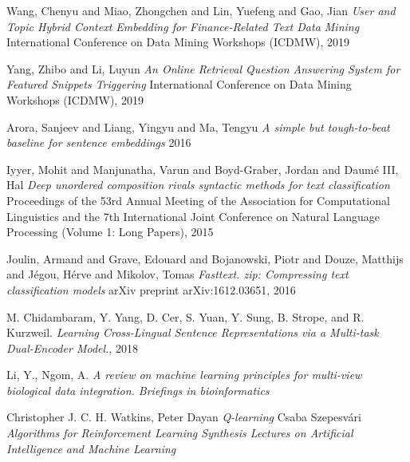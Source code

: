 \begin{thebibliography}{9}
Wang, Chenyu and Miao, Zhongchen and Lin, Yuefeng and Gao, Jian\newline
\textit{User and Topic Hybrid Context Embedding for Finance-Related Text Data Mining} International Conference on Data Mining Workshops (ICDMW), 2019

Yang, Zhibo and Li, Luyun\newline
\textit{An Online Retrieval Question Answering System for Featured Snippets Triggering} International Conference on Data Mining Workshops (ICDMW), 2019

Arora, Sanjeev and Liang, Yingyu and Ma, Tengyu\newline
\textit{A simple but tough-to-beat baseline for sentence embeddings}
2016

Iyyer, Mohit and Manjunatha, Varun and Boyd-Graber, Jordan and Daum{\'e} III, Hal\newline
\textit{Deep unordered composition rivals syntactic methods for text classification}\newline
Proceedings of the 53rd Annual Meeting of the Association for Computational Linguistics and the 7th International Joint Conference on Natural Language Processing (Volume 1: Long Papers), 2015

Joulin, Armand and Grave, Edouard and Bojanowski, Piotr and Douze, Matthijs and J{\'e}gou, H{\'e}rve and Mikolov, Tomas\newline
\textit{Fasttext. zip: Compressing text classification models}\newline
arXiv preprint arXiv:1612.03651, 2016

M. Chidambaram, Y. Yang, D. Cer, S. Yuan, Y. Sung, B. Strope, and R. Kurzweil. \newline
\textit{Learning Cross-Lingual Sentence Representations via a Multi-task Dual-Encoder Model.}, 2018

Li, Y., Ngom, A.\newline
\textit{A review on machine learning principles for multi-view biological data integration. Briefings in bioinformatics}

Christopher J. C. H. Watkins, Peter Dayan\newline
\textit{Q-learning}
Csaba Szepesvári\newline
\textit{Algorithms for Reinforcement Learning
Synthesis Lectures on Artificial Intelligence and Machine Learning}


\end{thebibliography}

